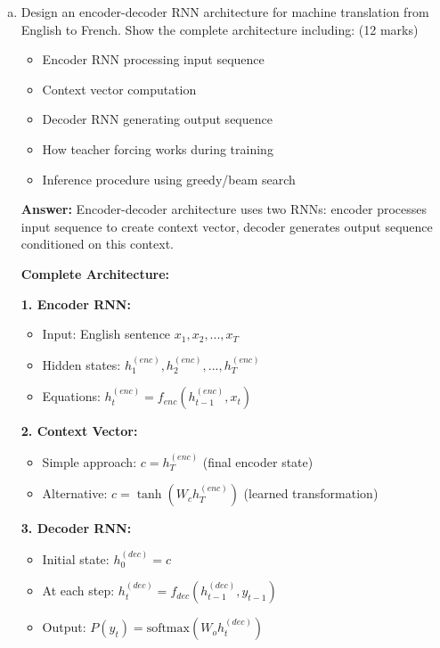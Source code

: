 \documentclass[12pt]{article}
\newcommand{\answer}[1]{{\color{answercolor}\textbf{Answer:} #1}}
\newcommand{\explanation}[1]{{\color{explanationcolor}#1}}
\begin{document}
\begin{enumerate}[(a)]
    \item Design an encoder-decoder RNN architecture for machine translation from English to French. Show the complete architecture including: \hfill (12 marks)
    \begin{itemize}
        \item Encoder RNN processing input sequence
        \item Context vector computation
        \item Decoder RNN generating output sequence
        \item How teacher forcing works during training
        \item Inference procedure using greedy/beam search
    \end{itemize}
    
    \answer{Encoder-decoder architecture uses two RNNs: encoder processes input sequence to create context vector, decoder generates output sequence conditioned on this context.}
    
    \explanation{
    \textbf{Complete Architecture:}
    
    \textbf{1. Encoder RNN:}
    \begin{itemize}
        \item Input: English sentence $x_1, x_2, ..., x_T$
        \item Hidden states: $h_1^{(enc)}, h_2^{(enc)}, ..., h_T^{(enc)}$
        \item Equations: $h_t^{(enc)} = f_{enc}(h_{t-1}^{(enc)}, x_t)$
    \end{itemize}
    
    \textbf{2. Context Vector:}
    \begin{itemize}
        \item Simple approach: $c = h_T^{(enc)}$ (final encoder state)
        \item Alternative: $c = \tanh(W_c h_T^{(enc)})$ (learned transformation)
    \end{itemize}
    
    \textbf{3. Decoder RNN:}
    \begin{itemize}
        \item Initial state: $h_0^{(dec)} = c$
        \item At each step: $h_t^{(dec)} = f_{dec}(h_{t-1}^{(dec)}, y_{t-1})$
        \item Output: $P(y_t) = \text{softmax}(W_o h_t^{(dec)})$
    \end{itemize}
    
}
\end{enumerate}
\end{document}

